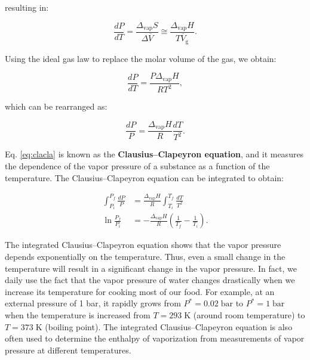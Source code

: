 \documentclass[
  9pt,
]{extbook}
\theoremstyle{definition}
\theoremstyle{definition}
\theoremstyle{definition}
\theoremstyle{definition}
\theoremstyle{remark}
\begin{document}
resulting in:

\begin{equation}
 \frac{dP}{dT} = \frac{ \Delta_{\text{vap}} S}{\Delta \overline{V}} \cong \frac{ \Delta_{\text{vap}} H}{T \overline{V}_{\mathrm{g}}}.
\label{eq:clacla2}
\end{equation}

Using the ideal gas law to replace the molar volume of the gas, we obtain:

\begin{equation}
 \frac{dP}{dT} = \frac{P \Delta_{\text{vap}} H}{RT^2},
\label{eq:clacla3}
\end{equation}

which can be rearranged as:

\begin{equation}
 \frac{dP}{P} = \frac{\Delta_{\text{vap}} H}{R} \frac{dT}{T^2}.
\label{eq:clacla}
\end{equation}

Eq. \eqref{eq:clacla} is known as the \textbf{Clausius--Clapeyron equation}, and it measures the dependence of the vapor pressure of a substance as a function of the temperature. The Clausius--Clapeyron equation can be integrated to obtain:

\begin{equation}
\begin{aligned}
\int_{P_i}^{P_f} \frac{dP}{P} &= \frac{\Delta_{\text{vap}} H}{R} \int_{T_i}^{T_f} \frac{dT}{T^2} \\
\ln \frac{P_f}{P_i} &=-\frac{\Delta_{\text{vap}} H}{R} \left( \frac{1}{T_f}-\frac{1}{T_i} \right).
\end{aligned}
\label{eq:clacla4}
\end{equation}

The integrated Clausius--Clapeyron equation shows that the vapor pressure depends exponentially on the temperature. Thus, even a small change in the temperature will result in a significant change in the vapor pressure. In fact, we daily use the fact that the vapor pressure of water changes drastically when we increase its temperature for cooking most of our food. For example, at an external pressure of 1 bar, it rapidly grows from \(P^*=0.02\;\text{bar}\) to \(P^*=1\;\text{bar}\) when the temperature is increased from \(T=293\;\mathrm{K}\) (around room temperature) to \(T=373\;\mathrm{K}\) (boiling point). The integrated Clausius--Clapeyron equation is also often used to determine the enthalpy of vaporization from measurements of vapor pressure at different temperatures.
\end{document}
